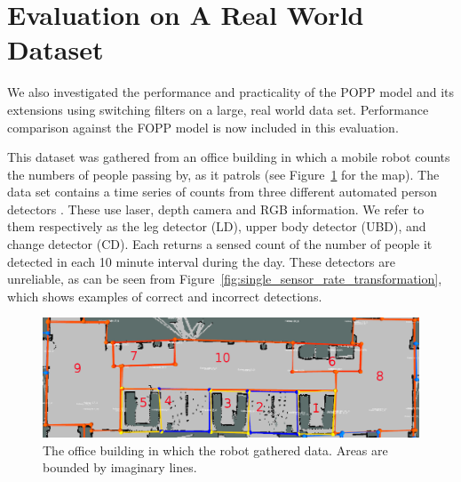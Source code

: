 \section{Evaluation on A Real World Dataset}
\label{sec:evareal}

We also investigated the performance and practicality of the POPP model and its extensions using switching filters on a large, real world data set. Performance comparison against the FOPP model is now included in this evaluation.

This dataset was gathered from an office building in which a mobile robot counts the numbers of people passing by, as it patrols (see Figure~\ref{fig:map_popp_independent_test} for the map). The data set contains a time series of counts from three different automated person detectors \cite{dondrup2015real}. These use laser, depth camera and RGB information. We refer to them respectively as the leg detector (LD), upper body detector (UBD), and change detector (CD). Each returns a sensed count of the number of people it detected in each 10 minute interval during the day. These detectors are unreliable, as can be seen from Figure~\ref{fig:single_sensor_rate_transformation}, which shows examples of correct and incorrect detections.

\begin{figure}[t]
	\centering
	\includegraphics[width=0.95\columnwidth]{./figures/map_popp.png}
	\caption{The office building in which the robot gathered data. Areas are bounded by imaginary lines.}
	\label{fig:map_popp_independent_test}
\end{figure}


